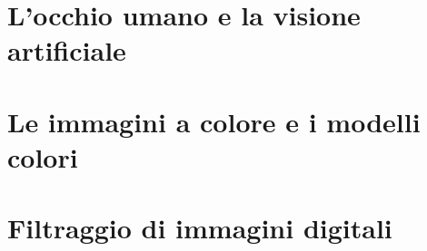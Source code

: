\documentclass[12 pt]{article}
\begin{document}
\newgeometry{}

\tableofcontents
\restoregeometry

\section{L'occhio umano e la visione artificiale}


\section{Le immagini a colore e i modelli colori}


\section{Filtraggio di immagini digitali}

\end{document}
